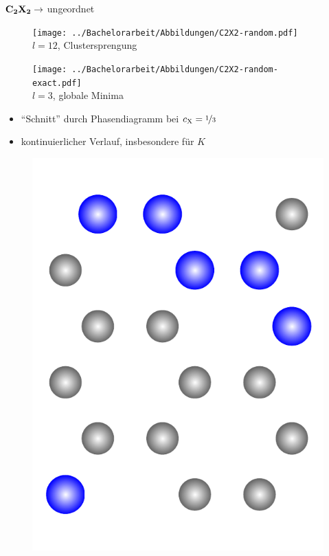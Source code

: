 \documentclass{beamer}
\def \cX {c_\mathrm{X}}
\begin{document}
	\begin{frame}{$\bf C_{\boldsymbol 2}X_{\boldsymbol 2} \rightarrow$ ungeordnet}
		\begin{figure}
			\scriptsize
			\begin{minipage}{0.48\textwidth}
				\centering
				\texttt{[image: ../Bachelorarbeit/Abbildungen/C2X2-random.pdf]} \\
				$l = 12$, Clustersprengung
			\end{minipage}
			\hfill
			\begin{minipage}{0.48\textwidth}
				\centering
				\texttt{[image: ../Bachelorarbeit/Abbildungen/C2X2-random-exact.pdf]} \\
				$l = 3$, globale Minima
			\end{minipage}
		\end{figure}
		\begin{itemize}
			\item "`Schnitt"' durch Phasendiagramm bei $\cX = \nicefrac 1 3$
			\item kontinuierlicher Verlauf, insbesondere für $K$
		\end{itemize}
		\begin{figure}
			\scriptsize
			\begin{minipage}[b]{0.19\textwidth}
				\centering
				\includegraphics[height=1.1\textwidth]{Abbildungen/1.pdf} \\

\end{minipage}
\end{figure}
\end{frame}
\end{document}
